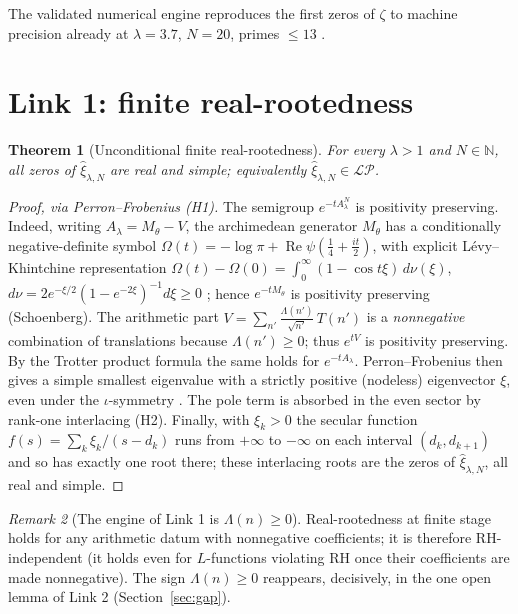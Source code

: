 \documentclass[11pt]{amsart}
\newtheorem{theorem}{Theorem}[section]
\theoremstyle{definition}
\theoremstyle{remark}
\newtheorem{remark}[theorem]{Remark}
\newcommand{\RH}{\mathrm{RH}}
\newcommand{\bbN}{\mathbb{N}}
\newcommand{\xih}{\widehat{\xi}}
\newcommand{\Lam}{\Lambda}
\newcommand{\LP}{\mathcal{LP}}
\DeclareMathOperator{\Real}{Re}
\begin{document}
The validated numerical engine reproduces the first zeros of $\zeta$ to
machine precision already at $\lambda=3.7$, $N=20$, primes $\leq13$
\cite{Pccm}.

\section{Link 1: finite real-rootedness}\label{sec:e1}

\begin{theorem}[Unconditional finite real-rootedness]\label{thm:e1}
For every $\lambda>1$ and $N\in\bbN$, all zeros of $\xih_{\lambda,N}$ are
real and simple; equivalently $\xih_{\lambda,N}\in\LP$.
\end{theorem}
\begin{proof}[Proof, via Perron--Frobenius (H1)]
The semigroup $e^{-tA_\lambda^N}$ is positivity preserving. Indeed, writing
$A_\lambda=M_\theta-V$, the archimedean generator $M_\theta$ has a
conditionally negative-definite symbol
$\Omega(t)=-\log\pi+\Real\psi(\tfrac14+\tfrac{it}{2})$, with explicit
L\'evy--Khintchine representation
$\Omega(t)-\Omega(0)=\int_0^\infty(1-\cos t\xi)\,d\nu(\xi)$,
$d\nu=2e^{-\xi/2}(1-e^{-2\xi})^{-1}d\xi\geq0$ \cite{Ph1}; hence $e^{-tM_\theta}$
is positivity preserving (Schoenberg). The arithmetic part
$V=\sum_{n'}\frac{\Lam(n')}{\sqrt{n'}}\,T(n')$ is a \emph{nonnegative}
combination of translations because $\Lam(n')\geq0$; thus $e^{tV}$ is
positivity preserving. By the Trotter product formula the same holds for
$e^{-tA_\lambda}$. Perron--Frobenius then gives a simple smallest eigenvalue
with a strictly positive (nodeless) eigenvector $\xi$, even under the
$\iota$-symmetry \cite{Ph1}. The pole term is absorbed in the even sector by
rank-one interlacing (H2). Finally, with $\xi_k>0$ the secular function
$f(s)=\sum_k\xi_k/(s-d_k)$ runs from $+\infty$ to $-\infty$ on each interval
$(d_k,d_{k+1})$ and so has exactly one root there; these interlacing roots are
the zeros of $\xih_{\lambda,N}$, all real and simple.
\end{proof}

\begin{remark}[The engine of Link 1 is $\Lam(n)\geq0$]\label{rem:engine}
Real-rootedness at finite stage holds for any arithmetic datum with
nonnegative coefficients; it is therefore $\RH$-independent (it holds even for
$L$-functions violating $\RH$ once their coefficients are made nonnegative).
The sign $\Lam(n)\geq0$ reappears, decisively, in the one open lemma of
Link 2 (Section~\ref{sec:gap}).
\end{remark}
\end{document}
